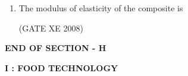 \documentclass[12pt]{article}
\begin{document}
\begin{enumerate}
(GATE XE 2008)

\item  The modulus of elasticity of the composite is  

\begin{enumerate}
\end{enumerate}

(GATE XE 2008)

\end{enumerate}
\begin{center}
    \textbf{END OF SECTION - H}
\end{center}

 \newpage

\begin{center}
    \textbf{\Large I : FOOD TECHNOLOGY}
\end{center}
\end{document}
